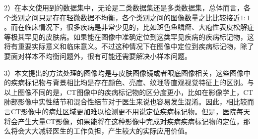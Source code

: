2）在本文使用到的数据集中，无论是二类数据集还是多类数据集，总体而言，各个类别之间只是存在轻微数据不均衡，各个类别之间的图像数量之比比较接近$1:1$。而在临床情况下，很多疾病是非常少见的，比如斑色鱼鳞癣、大疱性表皮松解症等极其罕见的皮肤病。如果能在图像中准确定位到这类罕见疾病的疾病标记物，这将有重要实际意义和临床意义。不过这种情况下在图像中定位到疾病标记物，除了要面对样本不均衡问题外，很有可能还需要解决小样本问题。

3）本文提出的方法处理的图像均是与皮肤图像镜或者眼底图像相关，这些图像中的疾病标记物与背景相比均是存在颜色、亮度、纹理等直观视觉特征上的区别。与以上图像不同的是，CT图像中的疾病标记物的区分度更小，比如在影像学上，CT肺部影像中实性结节和混合性结节对于医生来说也容易发生混淆。因此，相比较而言CT影像中的病灶区域更加难以检测更不用说定位疾病标记物。但是，医院每天将会产生大量CT影像，如果能将在这种影像中完成对疾病疾病标记物的定位，那么将会大大减轻医生的工作负担，产生较大的实际应用价值。

